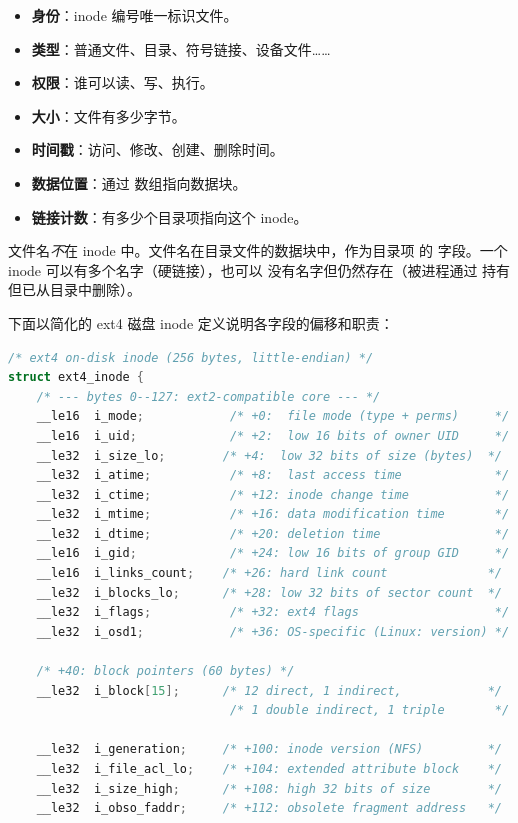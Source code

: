 \begin{filesystemlayout}
\begin{itemize}\tightlist
\item \textbf{身份}：inode 编号唯一标识文件。
\item \textbf{类型}：普通文件、目录、符号链接、设备文件……
\item \textbf{权限}：谁可以读、写、执行。
\item \textbf{大小}：文件有多少字节。
\item \textbf{时间戳}：访问、修改、创建、删除时间。
\item \textbf{数据位置}：通过  数组指向数据块。
\item \textbf{链接计数}：有多少个目录项指向这个 inode。
\end{itemize}

文件名\emph{不}在 inode 中。文件名在目录文件的数据块中，作为目录项
的  字段。一个 inode 可以有多个名字（硬链接），也可以
没有名字但仍然存在（被进程通过  持有但已从目录中删除）。


下面以简化的 ext4 磁盘 inode 定义说明各字段的偏移和职责：

\begin{lstlisting}[language=C]
/* ext4 on-disk inode (256 bytes, little-endian) */
struct ext4_inode {
    /* --- bytes 0--127: ext2-compatible core --- */
    __le16  i_mode;            /* +0:  file mode (type + perms)     */
    __le16  i_uid;             /* +2:  low 16 bits of owner UID     */
    __le32  i_size_lo;        /* +4:  low 32 bits of size (bytes)  */
    __le32  i_atime;           /* +8:  last access time             */
    __le32  i_ctime;           /* +12: inode change time            */
    __le32  i_mtime;           /* +16: data modification time       */
    __le32  i_dtime;           /* +20: deletion time                */
    __le16  i_gid;             /* +24: low 16 bits of group GID     */
    __le16  i_links_count;    /* +26: hard link count              */
    __le32  i_blocks_lo;      /* +28: low 32 bits of sector count  */
    __le32  i_flags;           /* +32: ext4 flags                   */
    __le32  i_osd1;            /* +36: OS-specific (Linux: version) */

    /* +40: block pointers (60 bytes) */
    __le32  i_block[15];      /* 12 direct, 1 indirect,            */
                               /* 1 double indirect, 1 triple       */

    __le32  i_generation;     /* +100: inode version (NFS)         */
    __le32  i_file_acl_lo;    /* +104: extended attribute block    */
    __le32  i_size_high;      /* +108: high 32 bits of size        */
    __le32  i_obso_faddr;     /* +112: obsolete fragment address   */


\end{lstlisting}
\end{filesystemlayout}
